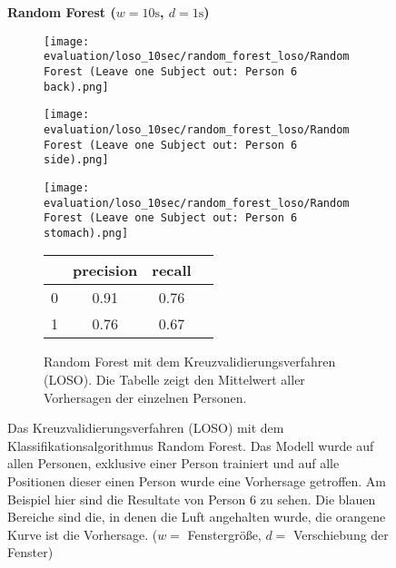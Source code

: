 \begin{figure}[H]
\begin{subfigure}{1\textwidth}
    \end{subfigure}
    \newline
    \vspace*{1 cm}
    \newline
    \textbf{Random Forest ($w=10\si{\s}$, $d=1\si{\s}$)}
    \begin{subfigure}{1\textwidth}
      \texttt{[image: evaluation/loso\_10sec/random\_forest\_loso/Random Forest (Leave one Subject out: Person 6 back).png]}
    \end{subfigure}
    \begin{subfigure}{1\textwidth}
      \texttt{[image: evaluation/loso\_10sec/random\_forest\_loso/Random Forest (Leave one Subject out: Person 6 side).png]}
    \end{subfigure}
    \begin{subfigure}{1\textwidth}
      \texttt{[image: evaluation/loso\_10sec/random\_forest\_loso/Random Forest (Leave one Subject out: Person 6 stomach).png]}
  \end{subfigure}

  \begin{subfigure}{1\textwidth}
      \begin{center}
          \begin{tabular}{ | l | c | c | r | }
            \hline
             & precision & recall & \\ \hline
            0 & 0.91 & 0.76 & \\ \hline
            1 & 0.76 & 0.67 & \\
            \hline
          \end{tabular}
      \end{center}
      \caption{Random Forest mit dem Kreuzvalidierungsverfahren (LOSO). Die Tabelle zeigt den Mittelwert aller Vorhersagen der einzelnen Personen.}
      \label{implementation:app:screenshots:user_studies_information}
  \end{subfigure}
    \caption{Das Kreuzvalidierungsverfahren (LOSO) mit dem Klassifikationsalgorithmus Random Forest. Das Modell wurde auf allen Personen, exklusive einer Person trainiert und auf alle Positionen dieser einen Person wurde eine Vorhersage getroffen. Am Beispiel hier sind die Resultate von Person 6 zu sehen. Die blauen Bereiche sind die, in denen die Luft angehalten wurde, die orangene Kurve ist die Vorhersage. ($w=$ Fenstergröße, $d=$ Verschiebung der Fenster)}
\label{evaluation:random_forest_loso:person6}
\end{figure}

